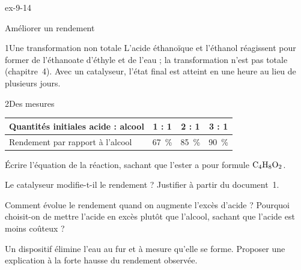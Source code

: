 \begin{blocLivre}{ex-9-14}
\begin{exercice}[3]{Améliorer un rendement}
\begin{docu}{1}{Une transformation non totale}
L'acide éthanoïque et l'éthanol réagissent pour former de l'éthanoate d'éthyle et de l'eau ; la transformation n'est pas
totale (chapitre~4). Avec un catalyseur, l'état final est atteint en une heure au lieu de plusieurs jours.
\end{docu}
\begin{docu}{2}{Des mesures}
\par\smallskip\noindent\hfill\begin{tabular}{lccc}
\toprule
Quantités initiales acide : alcool & 1 : 1 & 2 : 1 & 3 : 1 \\
\midrule
Rendement par rapport à l'alcool & \qty{67}{\percent} & \qty{85}{\percent} & \qty{90}{\percent} \\
\bottomrule
\end{tabular}\hfill\null\par\smallskip
\end{docu}
\begin{questions}
\item Écrire l'équation de la réaction, sachant que l'ester a pour formule $\ce{C4H8O2}$.
\item Le catalyseur modifie-t-il le rendement ? Justifier à partir du document~1.
\item Comment évolue le rendement quand on augmente l'excès d'acide ? Pourquoi choisit-on de mettre l'acide en excès plutôt
que l'alcool, sachant que l'acide est moins coûteux ?
\item \initiative Un dispositif élimine l'eau au fur et à mesure qu'elle se forme. Proposer une explication à la forte hausse du
rendement observée.
\end{questions}
\end{exercice}
\end{blocLivre}
